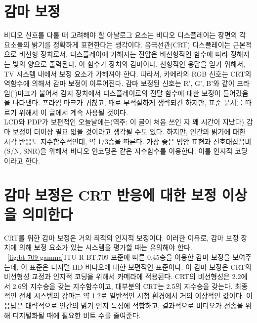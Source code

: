 \section{감마 보정}
비디오 신호를 다룰 때 고려해야 할 아날로그 요소는 비디오 디스플레이는 장면의 각 요소들의 밝기를 정확하게 표현한다는 생각이다.
음극선관(CRT) 디스플레이는 근본적으로 비선형 장치로서, 디스플레이에 가해지는 전압은 비선형적인 함수에 따라 정해지는 빛의 양으로 출력된다.
이 함수가 장치의 감마이다. 선형적인 응답을 얻기 위해서, TV 시스템 내에서 보정 요소가 가해져야 한다.
따라서, 카메라의 RGB 신호는 CRT의 역함수에 의해서 감마 보정이 이루어진다. 감마 보정된 신호는 R', G', B'와 같이 프라임(')마크가 붙어서 감지 장치에서 디스플레이로의 전달 함수에 대한 보정이 들어갔음을 나타낸다.
프라임 마크가 귀찮고, 때로 부적절하게 생략되긴 하지만, 표준 문서를 따르기 위해서 이 글에서 계속 사용될 것이다.
\\
LCD와 PDP가 보편적인 오늘날에는(역주: 이 글이 처음 쓰인 지 꽤 시간이 지났다) 감마 보정이 더이상 필요 없을 것이라고 생각될 수도 있다.
하지만, 인간의 밝기에 대한 시각 반응도 지수함수적인데, 약 1/3승을 따른다. 가장 좋은 명암 표현과 신호대잡음비(S/N, SNR)을 위해서 비디오 인코딩은 같은 지수함수를 이용한다. 이를 인지적 코딩이라고 한다.

\section{감마 보정은 CRT 반응에 대한 보정 이상을 의미한다}
CRT를 위한 감마 보정은 거의 최적의 인지적 보정이다. 이러한 이유로, 감마 보정 장치에 의해 보정 요소가 있는 시스템을 평가할 때는 유의해야 한다.
\\
\figurename~\ref{fig:bt 709 gamma}\는 ITU-R BT.709 표준에 따른 0.45승을 이용한 감마 보정을 보여주는데, 이 표준은 디지털 HD 비디오에 대한 보편적인 표준이다.
이 감마 보정은 CRT의 비선형성 교정과 인지적 코딩을 위해서 카메라에 적용된다. CRT의 비선형성은 2.2에서 2.6의 지수승을 갖는 지수함수이고, 대부분의 CRT는 2.5의 지수승을 갖는다.
최종적인 전체 시스템의 감마는 약 1.2로 일반적인 시청 환경에서 거의 이상적인 값이다. 이 응답은 대략적으로 인간의 밝기 인지 특성에 적합하고, 결과적으로 비디오가 전송을 위해 디지털화될 때에 필요한 비트 수를 줄여준다.

